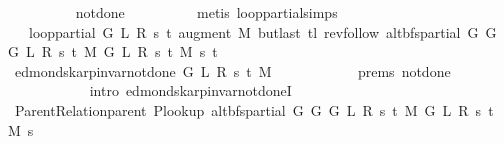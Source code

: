 \begin{isabellebody}
\ \ \ \ \ \ \ \ \isamarkupfalse%
\ not{\isacharunderscore}{\kern0pt}done{\isacharunderscore}{\kern0pt}{}\isanewline
\ \ \ \ \ \ \ \ \isamarkupfalse%
\ {\isacharparenleft}{\kern0pt}metis\ loop{\isacharprime}{\kern0pt}{\isacharunderscore}{\kern0pt}partial{\isachardot}{\kern0pt}simps{\isacharparenright}{\kern0pt}\isanewline
\ \ \ \ \ \ \isamarkupfalse%
\ \isamarkupfalse%
\ {\isachardoublequoteopen}{\isachardot}{\kern0pt}{\isachardot}{\kern0pt}{\isachardot}{\kern0pt}\ {\isacharequal}{\kern0pt}\ loop{\isacharprime}{\kern0pt}{\isacharunderscore}{\kern0pt}partial\ G\ L\ R\ s\ t\ {\isacharparenleft}{\kern0pt}augment\ M\ {\isacharparenleft}{\kern0pt}butlast\ {\isacharparenleft}{\kern0pt}tl\ {\isacharparenleft}{\kern0pt}rev{\isacharunderscore}{\kern0pt}follow\ {\isacharparenleft}{\kern0pt}alt{\isacharunderscore}{\kern0pt}bfs{\isacharunderscore}{\kern0pt}partial\ {\isacharparenleft}{\kern0pt}G{}\ G\ {\isacharparenleft}{\kern0pt}G{}\ L\ R\ s\ t\ M{\isacharparenright}{\kern0pt}{\isacharparenright}{\kern0pt}\ {\isacharparenleft}{\kern0pt}G{}\ L\ R\ s\ t\ M{\isacharparenright}{\kern0pt}\ s{\isacharparenright}{\kern0pt}\ t{\isacharparenright}{\kern0pt}{\isacharparenright}{\kern0pt}{\isacharparenright}{\kern0pt}{\isacharparenright}{\kern0pt}{\isachardoublequoteclose}\isanewline
\ \ \ \ \ \ \isamarkupfalse%
\ {\isacharminus}{\kern0pt}\isanewline
\ \ \ \ \ \ \ \ \isamarkupfalse%
\ {\isachardoublequoteopen}edmonds{\isacharunderscore}{\kern0pt}karp{\isacharunderscore}{\kern0pt}invar{\isacharunderscore}{\kern0pt}not{\isacharunderscore}{\kern0pt}done{\isacharunderscore}{\kern0pt}{}{\isacharprime}{\kern0pt}\ G\ L\ R\ s\ t\ M{\isachardoublequoteclose}\isanewline
\ \ \ \ \ \ \ \ \ \ \isamarkupfalse%
\ {\isachardoublequoteopen}{}{\isachardot}{\kern0pt}prems{\isachardoublequoteclose}\ not{\isacharunderscore}{\kern0pt}done{\isacharunderscore}{\kern0pt}{}\isanewline
\ \ \ \ \ \ \ \ \ \ \isamarkupfalse%
\ {\isacharparenleft}{\kern0pt}intro\ edmonds{\isacharunderscore}{\kern0pt}karp{\isacharunderscore}{\kern0pt}invar{\isacharunderscore}{\kern0pt}not{\isacharunderscore}{\kern0pt}done{\isacharunderscore}{\kern0pt}{}I{\isacharparenright}{\kern0pt}\isanewline
\ \ \ \ \ \ \ \ \isamarkupfalse%
\ {\isachardoublequoteopen}Parent{\isacharunderscore}{\kern0pt}Relation{\isachardot}{\kern0pt}parent\ {\isacharparenleft}{\kern0pt}P{\isacharunderscore}{\kern0pt}lookup\ {\isacharparenleft}{\kern0pt}alt{\isacharunderscore}{\kern0pt}bfs{\isacharunderscore}{\kern0pt}partial\ {\isacharparenleft}{\kern0pt}G{}\ G\ {\isacharparenleft}{\kern0pt}G{}\ L\ R\ s\ t\ M{\isacharparenright}{\kern0pt}{\isacharparenright}{\kern0pt}\ {\isacharparenleft}{\kern0pt}G{}\ L\ R\ s\ t\ M{\isacharparenright}{\kern0pt}\ s{\isacharparenright}{\kern0pt}{\isacharparenright}{\kern0pt}{\isachardoublequoteclose}\isanewline

\end{isabellebody}
